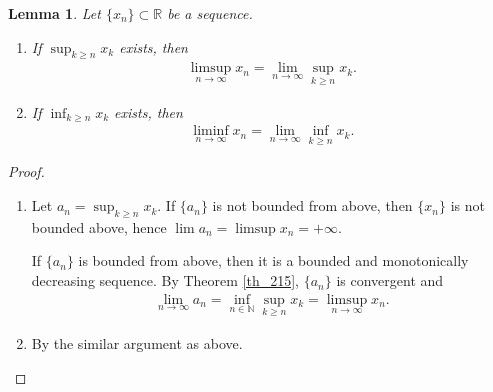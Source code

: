 \documentclass[11pt]{book}
\newtheorem{lemma}{Lemma}[chapter]
\theoremstyle{definition}
\numberwithin{equation}{chapter}
\begin{document}
\begin{lemma}
Let $\{x_n\} \subset \mathbb{R}$ be a sequence.
\begin{enumerate}[label=(\alph*)]
    \item If $\sup_{k \geq n} x_k$ exists, then
    \begin{align*}
        \limsup_{n\to\infty} x_n = \lim_{n\to\infty} \sup_{k \geq n} x_k.
    \end{align*}
    
    \item If $\inf_{k \geq n} x_k$ exists, then
    \begin{align*}
        \liminf_{n\to\infty} x_n = \lim_{n\to\infty} \inf_{k \geq n} x_k.
    \end{align*}
\end{enumerate}
\end{lemma}
\begin{proof}
~\begin{enumerate}[label=(\alph*)]
    \item Let $a_n = \sup_{k\geq n}x_k$. If $\{a_n\}$ is not bounded from above, then $\{x_n\}$ is not bounded above, hence $\lim a_n = \limsup x_n = + \infty$. 
    
    If $\{a_n\}$ is bounded from above, then it is a bounded and monotonically decreasing sequence. By Theorem \ref{th_215}, $\{a_n\}$ is convergent and
    \begin{align*}
        \lim_{n\to\infty} a_n = \inf_{n \in \mathbb{N}} \sup_{k \geq n} x_k = \limsup_{n\to\infty} x_n.
    \end{align*}
    
    \item By the similar argument as above.
\end{enumerate}
\end{proof}

\medskip
\end{document}
